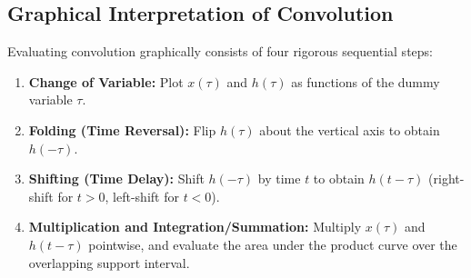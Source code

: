 \documentclass[12pt,a4paper]{article}
\begin{document}
\subsection{Graphical Interpretation of Convolution}
Evaluating convolution graphically consists of four rigorous sequential steps:
\begin{enumerate}[topsep=2pt, itemsep=3pt]
  \item \textbf{Change of Variable:} Plot $x(\tau)$ and $h(\tau)$ as functions of the dummy variable $\tau$.
  \item \textbf{Folding (Time Reversal):} Flip $h(\tau)$ about the vertical axis to obtain $h(-\tau)$.
  \item \textbf{Shifting (Time Delay):} Shift $h(-\tau)$ by time $t$ to obtain $h(t - \tau)$ (right-shift for $t > 0$, left-shift for $t < 0$).
  \item \textbf{Multiplication and Integration/Summation:} Multiply $x(\tau)$ and $h(t - \tau)$ pointwise, and evaluate the area under the product curve over the overlapping support interval.
\end{enumerate}
\end{document}
